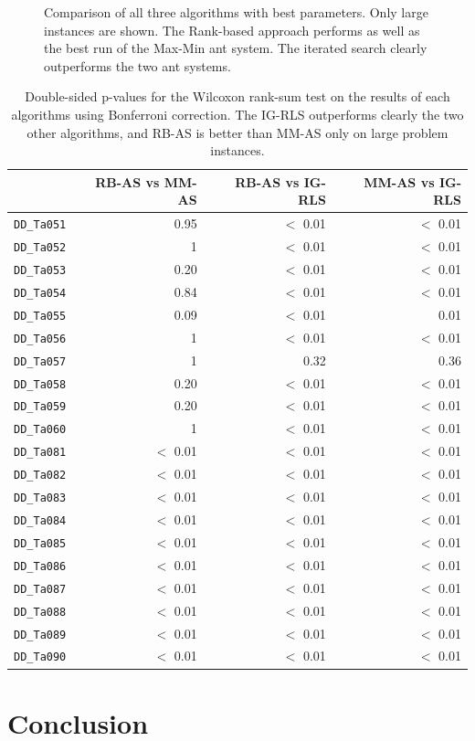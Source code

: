 \documentclass[runningheads]{llncs}
\begin{document}
\begin{figure}
\begin{minipage}{.48\textwidth}
		\caption{Comparison of all three algorithms with best parameters. Only
		large instances are shown. The Rank-based approach performs as well as
		the best run of the Max-Min ant system. The iterated search clearly
		outperforms the two ant systems.}
		\label{large-instances-results}
    \end{minipage}
\end{figure}

\begin{table}
	\centering
	\begin{tabular}{lrrr}
		\toprule
		& RB-AS vs MM-AS & RB-AS vs IG-RLS & MM-AS vs IG-RLS \\
		\midrule
		\texttt{DD\_Ta051} & 0.95     & $<$ 0.01 & $<$ 0.01 \\
		\texttt{DD\_Ta052} & 1        & $<$ 0.01 & $<$ 0.01 \\
		\texttt{DD\_Ta053} & 0.20     & $<$ 0.01 & $<$ 0.01 \\
		\texttt{DD\_Ta054} & 0.84     & $<$ 0.01 & $<$ 0.01 \\
		\texttt{DD\_Ta055} & 0.09     & $<$ 0.01 &     0.01 \\
		\texttt{DD\_Ta056} & 1        & $<$ 0.01 & $<$ 0.01 \\
		\texttt{DD\_Ta057} & 1        & 0.32     & 0.36     \\
		\texttt{DD\_Ta058} & 0.20     & $<$ 0.01 & $<$ 0.01 \\
		\texttt{DD\_Ta059} & 0.20     & $<$ 0.01 & $<$ 0.01 \\
		\texttt{DD\_Ta060} & 1        & $<$ 0.01 & $<$ 0.01 \\
		\texttt{DD\_Ta081} & $<$ 0.01 & $<$ 0.01 & $<$ 0.01 \\
		\texttt{DD\_Ta082} & $<$ 0.01 & $<$ 0.01 & $<$ 0.01 \\
		\texttt{DD\_Ta083} & $<$ 0.01 & $<$ 0.01 & $<$ 0.01 \\
		\texttt{DD\_Ta084} & $<$ 0.01 & $<$ 0.01 & $<$ 0.01 \\
		\texttt{DD\_Ta085} & $<$ 0.01 & $<$ 0.01 & $<$ 0.01 \\
		\texttt{DD\_Ta086} & $<$ 0.01 & $<$ 0.01 & $<$ 0.01 \\
		\texttt{DD\_Ta087} & $<$ 0.01 & $<$ 0.01 & $<$ 0.01 \\
		\texttt{DD\_Ta088} & $<$ 0.01 & $<$ 0.01 & $<$ 0.01 \\
		\texttt{DD\_Ta089} & $<$ 0.01 & $<$ 0.01 & $<$ 0.01 \\
		\texttt{DD\_Ta090} & $<$ 0.01 & $<$ 0.01 & $<$ 0.01 \\
		\bottomrule
	\end{tabular}
	\caption{Double-sided p-values for the Wilcoxon rank-sum test on the results
	of each algorithms using Bonferroni correction. The IG-RLS outperforms
	clearly the two other algorithms, and RB-AS is better than MM-AS only on large
	problem instances.}
\end{table}


\section{Conclusion}
\label{sec:conclusion}




\end{document}
